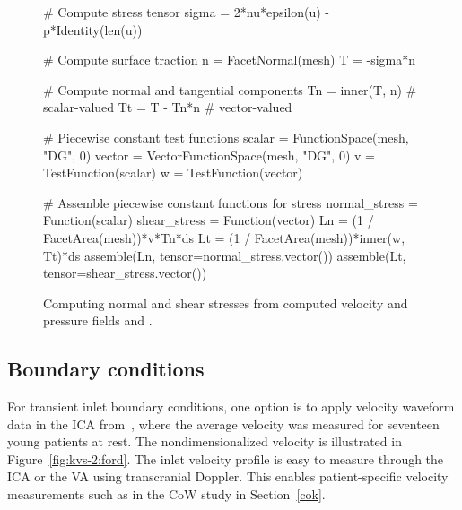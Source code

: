 
\begin{figure}
  \begin{center} \label{fig:kvs-2:stress_code}
    \begin{python}
# Compute stress tensor
sigma = 2*nu*epsilon(u) - p*Identity(len(u))

# Compute surface traction
n = FacetNormal(mesh)
T = -sigma*n

# Compute normal and tangential components
Tn = inner(T, n) # scalar-valued
Tt = T - Tn*n    # vector-valued

# Piecewise constant test functions
scalar = FunctionSpace(mesh, "DG", 0)
vector = VectorFunctionSpace(mesh, "DG", 0)
v = TestFunction(scalar)
w = TestFunction(vector)

# Assemble piecewise constant functions for stress
normal_stress = Function(scalar)
shear_stress = Function(vector)
Ln = (1 / FacetArea(mesh))*v*Tn*ds
Lt = (1 / FacetArea(mesh))*inner(w, Tt)*ds
assemble(Ln, tensor=normal_stress.vector())
assemble(Lt, tensor=shear_stress.vector())
    \end{python}
    \caption{Computing normal and shear stresses from computed
      velocity and pressure fields  and .}
  \end{center}
\end{figure}

\subsection{Boundary conditions} \label{resistance_bcs}

For transient inlet boundary conditions, one option is to apply
velocity waveform data in the ICA
from~\citet{FordAlperinLeeEtAl2005}, where the average velocity was
measured for seventeen young patients at rest. The nondimensionalized
velocity is illustrated in Figure~\ref{fig:kvs-2:ford}. The inlet
velocity profile is easy to measure through the ICA or the
VA using transcranial Doppler. This enables
patient-specific velocity measurements such as in the CoW study in
Section~\ref{cok}.




